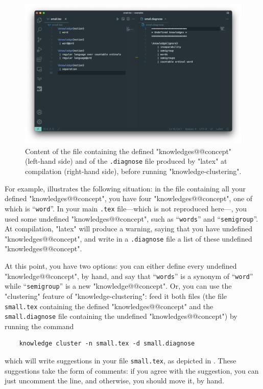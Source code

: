 \documentclass{article}
\begin{document}
\begin{figure}[htb]
    \centering
    \includegraphics[width=.9\textwidth]{img/small-before.png}
    \caption{%
        \label{fig:clustering-before}
        Content of the file containing the defined "knowledges@@concept"
        (left-hand side) and of the \texttt{.diagnose} file produced by
        "latex" at compilation (right-hand side), before running 
        "knowledge-clustering".
    }
\end{figure}

For example,  illustrates the following situation:
in the file containing all your defined "knowledges@@concept", you have
four "knowledges@@concept", one of which is ``\verb|word|''.
In your main \verb|.tex| file---which is not reproduced here---, you used some 
undefined "knowledges@@concept", such as ``\verb|words|'' and
``\verb|semigroup|''.
At compilation, "latex" will produce a warning, saying that you have undefined
"knowledges@@concept", and write in a \verb|.diagnose| file a list
of these undefined "knowledges@@concept".

At this point, you have two options: you can either define every undefined "knowledge@@concept", by hand, and say that ``\verb|words|'' is a synonym of
``\verb|word|'' while ``\verb|semigroup|'' is a new "knowledge@@concept".
Or, you can use the "clustering" feature of "knowledge-clustering": feed
it both files (the file \verb|small.tex| containing the defined 
"knowledges@@concept" and
the \verb|small.diagnose| file containing the undefined "knowledges@@concept")
by running the command
\begin{verbatim}
    knowledge cluster -n small.tex -d small.diagnose
\end{verbatim}
which will write suggestions in your file \verb|small.tex|,
as depicted in . These suggestions
take the form of comments: if you agree with the suggestion, you can just
uncomment the line, and otherwise, you should move it, by hand.
\end{document}
